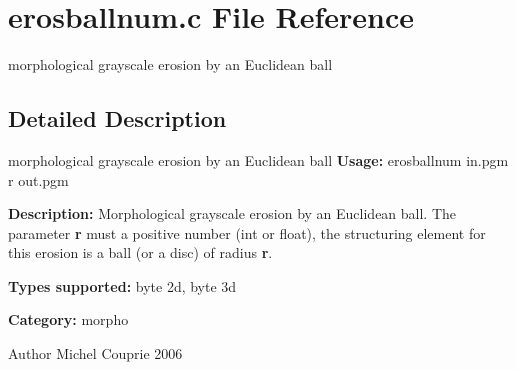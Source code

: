 \section{erosballnum.c File Reference}
\label{erosballnum_8c}


morphological grayscale erosion by an Euclidean ball  




\subsection{Detailed Description}
morphological grayscale erosion by an Euclidean ball {\bfseries Usage:} erosballnum in.pgm r out.pgm

{\bfseries Description:} Morphological grayscale erosion by an Euclidean ball. The parameter {\bfseries r} must a positive number (int or float), the structuring element for this erosion is a ball (or a disc) of radius {\bfseries r}.

{\bfseries Types supported:} byte 2d, byte 3d

{\bfseries Category:} morpho

\begin{DoxyAuthor}{Author}
Michel Couprie 2006 
\end{DoxyAuthor}
